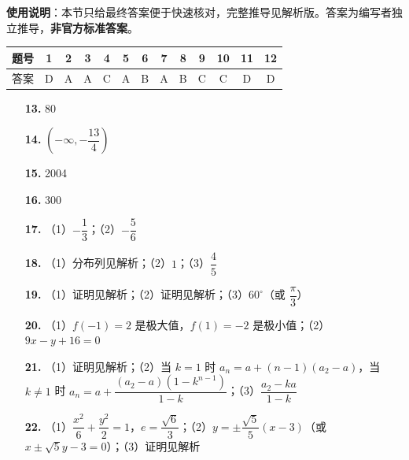
\begin{gknotice}
\textbf{使用说明}：本节只给最终答案便于快速核对，完整推导见解析版。答案为编写者独立推导，\textbf{非官方标准答案}。
\end{gknotice}

\begin{center}\begin{tabular}{ccccccccccccc}
\toprule
题号 & 1 & 2 & 3 & 4 & 5 & 6 & 7 & 8 & 9 & 10 & 11 & 12 \\
\midrule
答案 & D & A & A & C & A & B & A & B & C & C & D & D \\
\bottomrule
\end{tabular}\end{center}

\begin{itemize}[leftmargin=2.6em]
  \item[\textbf{13.}] 80
  \item[\textbf{14.}] $\left(-\infty, -\dfrac{13}{4}\right)$
  \item[\textbf{15.}] 2004
  \item[\textbf{16.}] 300
\end{itemize}

\begin{itemize}[leftmargin=2.6em]
  \item[\textbf{17.}] （1）$-\dfrac{1}{3}$；（2）$-\dfrac{5}{6}$
  \item[\textbf{18.}] （1）分布列见解析；（2）$1$；（3）$\dfrac{4}{5}$
  \item[\textbf{19.}] （1）证明见解析；（2）证明见解析；（3）$60^\circ$（或 $\dfrac{\pi}{3}$）
  \item[\textbf{20.}] （1）$f(-1) = 2$ 是极大值，$f(1) = -2$ 是极小值；（2）$9x - y + 16 = 0$
  \item[\textbf{21.}] （1）证明见解析；（2）当 $k = 1$ 时 $a_n = a + (n - 1)(a_2 - a)$，当 $k \ne 1$ 时 $a_n = a + \dfrac{(a_2 - a)(1 - k^{n-1})}{1 - k}$；（3）$\dfrac{a_2 - ka}{1 - k}$
  \item[\textbf{22.}] （1）$\dfrac{x^2}{6} + \dfrac{y^2}{2} = 1$，$e = \dfrac{\sqrt{6}}{3}$；（2）$y = \pm \dfrac{\sqrt{5}}{5}(x - 3)$（或 $x \pm \sqrt{5}y - 3 = 0$）；（3）证明见解析
\end{itemize}
